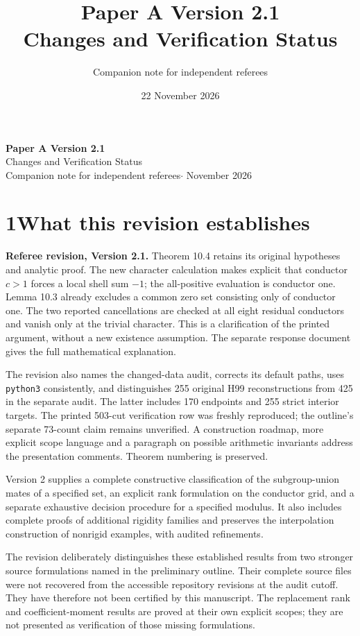 \documentclass[10pt]{article}
\title{Paper A Version 2.1\\Changes and Verification Status}
\author{Companion note for independent referees}
\date{22 November 2026}
\begin{document}
\begin{center}
{\Large\bfseries Paper A Version 2.1}\\[.35em]
{\large Changes and Verification Status}\\[.5em]
Companion note for independent referees\quad$\cdot$ November 2026
\end{center}

\section*{1\quad What this revision establishes}

\textbf{Referee revision, Version 2.1.} Theorem 10.4 retains its original
hypotheses and analytic proof. The new character calculation makes
explicit that conductor $c>1$ forces a local shell sum $-1$; the all-positive
evaluation is conductor one. Lemma 10.3 already excludes a common zero
set consisting only of conductor one. The two reported cancellations are
checked at all eight residual conductors and vanish only at the trivial
character. This is a clarification of the printed argument, without a
new existence assumption. The separate response document gives the full
mathematical explanation.

The revision also names the changed-data audit, corrects its default
paths, uses \texttt{python3} consistently, and distinguishes 255 original
H99 reconstructions from 425 in the separate audit. The latter includes
170 endpoints and 255 strict interior targets. The printed 503-cut
verification row was freshly reproduced; the outline's separate 73-count
claim remains unverified. A construction roadmap, more explicit scope
language and a paragraph on possible arithmetic invariants address the
presentation comments. Theorem numbering is preserved.

Version 2 supplies a complete constructive classification of the subgroup-union mates of a specified set, an explicit rank formulation on the conductor grid, and a separate exhaustive decision procedure for a specified modulus. It also includes complete proofs of additional rigidity families and preserves the interpolation construction of nonrigid examples, with audited refinements.

The revision deliberately distinguishes these established results from two stronger source formulations named in the preliminary outline. Their complete source files were not recovered from the accessible repository revisions at the audit cutoff. They have therefore not been certified by this manuscript. The replacement rank and coefficient-moment results are proved at their own explicit scopes; they are not presented as verification of those missing formulations.
\end{document}
